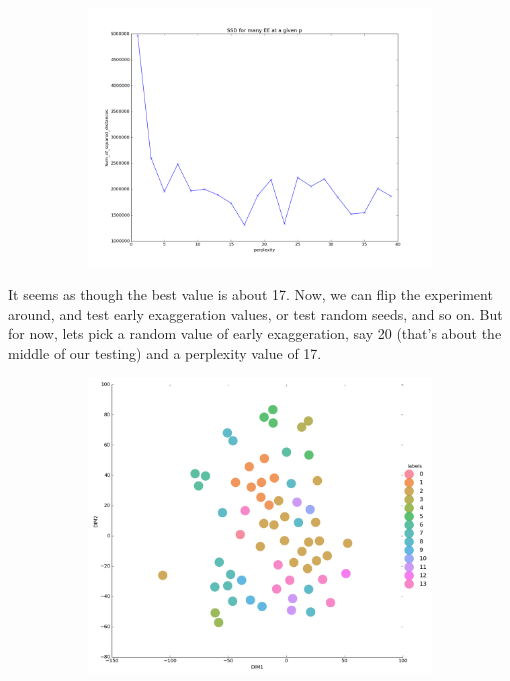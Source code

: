 \documentclass[20pt]{article} %
\begin{document}
\begin{figure}[!htbp]
  	\centering
   	\begin{subfigure}[p]{0.6\linewidth}
    	\includegraphics[width=\linewidth]{./figures/best_perp.png}
   	\end{subfigure}
\end{figure}
It seems as though the best value is about 17.  Now, we can flip the experiment around, and test early exaggeration values, or test random seeds, and so on.  But for now, lets pick a random value of early exaggeration, say 20 (that's about the middle of our testing) and a perplexity value of 17.
\begin{figure}[!htbp]
  	\centering
   	\begin{subfigure}[p]{0.7\linewidth}
    	\includegraphics[width=\linewidth]{./figures/best_tsne.png}
   	\end{subfigure}
\end{figure}
\end{document}
